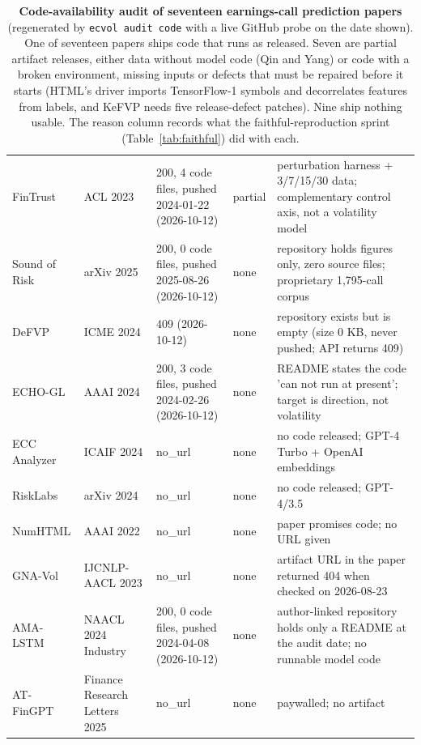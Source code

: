 \begin{table}[t]
\begin{tabular}{p{3.3cm}p{1.7cm}p{2.9cm}lp{6.0cm}}
FinTrust \citep{fintrust2023} & ACL 2023 & 200, 4 code files, pushed 2024-01-22 (2026-10-12) & partial & perturbation harness + 3/7/15/30 data; complementary control axis, not a volatility model \\
Sound of Risk \citep{soundofrisk2025} & arXiv 2025 & 200, 0 code files, pushed 2025-08-26 (2026-10-12) & none & repository holds figures only, zero source files; proprietary 1,795-call corpus \\
DeFVP \citep{niu2024does} & ICME 2024 & 409 (2026-10-12) & none & repository exists but is empty (size 0 KB, never pushed; API returns 409) \\
ECHO-GL \citep{echogl2024} & AAAI 2024 & 200, 3 code files, pushed 2024-02-26 (2026-10-12) & none & README states the code 'can not run at present'; target is direction, not volatility \\
ECC Analyzer \citep{cao2024ecc} & ICAIF 2024 & no\_url & none & no code released; GPT-4 Turbo + OpenAI embeddings \\
RiskLabs \citep{cao2024risklabs} & arXiv 2024 & no\_url & none & no code released; GPT-4/3.5 \\
NumHTML \citep{yang2022numhtml} & AAAI 2022 & no\_url & none & paper promises code; no URL given \\
GNA-Vol \citep{shi2023gnavol} & IJCNLP-AACL 2023 & no\_url & none & artifact URL in the paper returned 404 when checked on 2026-08-23 \\
AMA-LSTM \citep{ama2024} & NAACL 2024 Industry & 200, 0 code files, pushed 2024-04-08 (2026-10-12) & none & author-linked repository holds only a README at the audit date; no runnable model code \\
AT-FinGPT \citep{atfingpt2025} & Finance Research Letters 2025 & no\_url & none & paywalled; no artifact \\
\bottomrule
\end{tabular}
\caption{\textbf{Code-availability audit of seventeen earnings-call prediction papers}
(regenerated by \texttt{ecvol audit code} with a live GitHub probe on the
date shown). One of seventeen papers ships code that runs as released. Seven are partial
artifact releases, either data without model code (Qin and Yang) or code with a
broken environment, missing inputs or defects that must be repaired before it
starts (HTML's driver imports TensorFlow-1 symbols and decorrelates features from
labels, and KeFVP needs five release-defect patches). Nine ship nothing usable. The reason column records what the faithful-reproduction sprint
(Table~\ref{tab:faithful}) did with each.}
\label{tab:code-audit}
\end{table}
